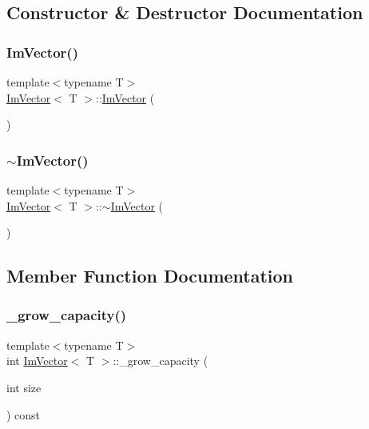 \subsection{Constructor \& Destructor Documentation}
\hypertarget{class_im_vector_a547fff373659fd848c3ecc6b25a83f25}{}\label{class_im_vector_a547fff373659fd848c3ecc6b25a83f25} 
\subsubsection{\texorpdfstring{Im\+Vector()}{ImVector()}}
{\footnotesize\ttfamily template$<$typename T$>$ \\
\hyperlink{class_im_vector}{Im\+Vector}$<$ T $>$\+::\hyperlink{class_im_vector}{Im\+Vector} (\begin{DoxyParamCaption}{ }\end{DoxyParamCaption})}

\hypertarget{class_im_vector_a9b782359ca26eaa1a6a6138fcf341c54}{}\label{class_im_vector_a9b782359ca26eaa1a6a6138fcf341c54} 
\subsubsection{\texorpdfstring{$\sim$\+Im\+Vector()}{~ImVector()}}
{\footnotesize\ttfamily template$<$typename T$>$ \\
\hyperlink{class_im_vector}{Im\+Vector}$<$ T $>$\+::$\sim$\hyperlink{class_im_vector}{Im\+Vector} (\begin{DoxyParamCaption}{ }\end{DoxyParamCaption})}



\subsection{Member Function Documentation}
\hypertarget{class_im_vector_af9dfc79dfd89c904830bebc492a18310}{}\label{class_im_vector_af9dfc79dfd89c904830bebc492a18310} 
\subsubsection{\texorpdfstring{\+\_\+grow\+\_\+capacity()}{\_grow\_capacity()}}
{\footnotesize\ttfamily template$<$typename T$>$ \\
int \hyperlink{class_im_vector}{Im\+Vector}$<$ T $>$\+::\+\_\+grow\+\_\+capacity (\begin{DoxyParamCaption}\item[{int}]{size }\end{DoxyParamCaption}) const}

